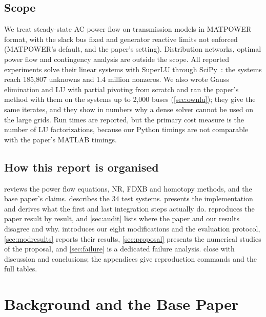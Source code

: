 \documentclass[11pt,a4paper]{article}
\begin{document}
\subsection{Scope}
We treat steady-state AC power flow on transmission models in MATPOWER format, with the slack bus fixed
and generator reactive limits not enforced (MATPOWER's default, and the paper's setting). Distribution
networks, optimal power flow and contingency analysis are outside the scope. All reported experiments
solve their linear systems with SuperLU through SciPy~\cite{scipy,superlu}: the systems reach 185{,}807
unknowns and 1.4 million nonzeros. We also wrote Gauss elimination and LU with partial pivoting from
scratch and ran the paper's method with them on the systems up to 2{,}000 buses (\cref{sec:ownlu}); they
give the same iterates, and they show in numbers why a dense solver cannot be used on the large grids.
Run times are reported, but the primary cost measure is the number of LU factorizations, because our
Python timings are not comparable with the paper's MATLAB timings.

\subsection{How this report is organised}
 reviews the power flow equations, NR, FDXB and homotopy methods, and the base paper's
claims.  describes the 34 test systems.  presents the implementation and
derives what the first and last integration steps actually do.  reproduces the paper
result by result, and \cref{sec:audit} lists where the paper and our results disagree and why.
 introduces our eight modifications and the evaluation protocol, \cref{sec:modresults}
reports their results, \cref{sec:proposal} presents the numerical studies of the proposal, and
\cref{sec:failure} is a dedicated failure analysis.  close with
discussion and conclusions; the appendices give reproduction commands and the full tables.


\section{Background and the Base Paper}\label{sec:background}
\end{document}

